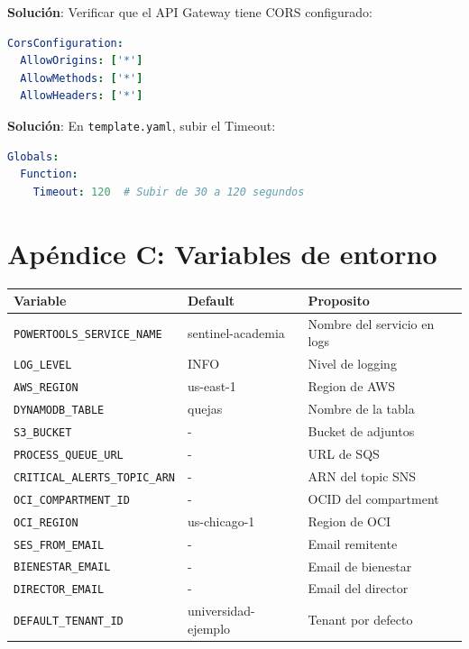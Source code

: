 \documentclass[11pt,a4paper]{article}
\begin{document}
\begin{tcolorbox}[colback=red!5!white, colframe=critical, title=\textbf{CORS error en frontend}]
\textbf{Soluci\'on}: Verificar que el API Gateway tiene CORS configurado:
\begin{lstlisting}[language=YAML]
CorsConfiguration:
  AllowOrigins: ['*']
  AllowMethods: ['*']
  AllowHeaders: ['*']
\end{lstlisting}
\end{tcolorbox}

\begin{tcolorbox}[colback=red!5!white, colframe=critical, title=\textbf{Lambda timeout}]
\textbf{Soluci\'on}: En \texttt{template.yaml}, subir el Timeout:
\begin{lstlisting}[language=YAML]
Globals:
  Function:
    Timeout: 120  # Subir de 30 a 120 segundos
\end{lstlisting}
\end{tcolorbox}

\section{Ap\'endice C: Variables de entorno}

\begin{longtable}{|p{5cm}|p{4cm}|p{5cm}|}
\hline
\rowcolor{primary!20}
\textbf{Variable} & \textbf{Default} & \textbf{Proposito} \\
\hline
\endhead
\texttt{POWERTOOLS\_SERVICE\_NAME} & sentinel-academia & Nombre del servicio en logs \\
\texttt{LOG\_LEVEL} & INFO & Nivel de logging \\
\texttt{AWS\_REGION} & us-east-1 & Region de AWS \\
\texttt{DYNAMODB\_TABLE} & quejas & Nombre de la tabla \\
\texttt{S3\_BUCKET} & - & Bucket de adjuntos \\
\texttt{PROCESS\_QUEUE\_URL} & - & URL de SQS \\
\texttt{CRITICAL\_ALERTS\_TOPIC\_ARN} & - & ARN del topic SNS \\
\texttt{OCI\_COMPARTMENT\_ID} & - & OCID del compartment \\
\texttt{OCI\_REGION} & us-chicago-1 & Region de OCI \\
\texttt{SES\_FROM\_EMAIL} & - & Email remitente \\
\texttt{BIENESTAR\_EMAIL} & - & Email de bienestar \\
\texttt{DIRECTOR\_EMAIL} & - & Email del director \\
\texttt{DEFAULT\_TENANT\_ID} & universidad-ejemplo & Tenant por defecto \\
\end{longtable}
\end{document}
